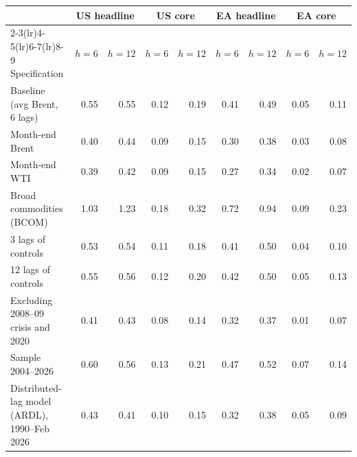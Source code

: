 \begin{tabular}{lrrrrrrrr}
\toprule
 & \multicolumn{2}{c}{US headline} & \multicolumn{2}{c}{US core} & \multicolumn{2}{c}{EA headline} & \multicolumn{2}{c}{EA core}\\
\cmidrule(lr){2-3}\cmidrule(lr){4-5}\cmidrule(lr){6-7}\cmidrule(lr){8-9}
Specification & $h=6$ & $h=12$ & $h=6$ & $h=12$ & $h=6$ & $h=12$ & $h=6$ & $h=12$\\
\midrule
Baseline (avg Brent, 6 lags) & 0.55 & 0.55 & 0.12 & 0.19 & 0.41 & 0.49 & 0.05 & 0.11\\
\midrule
Month-end Brent & 0.40 & 0.44 & 0.09 & 0.15 & 0.30 & 0.38 & 0.03 & 0.08\\
Month-end WTI & 0.39 & 0.42 & 0.09 & 0.15 & 0.27 & 0.34 & 0.02 & 0.07\\
Broad commodities (BCOM) & 1.03 & 1.23 & 0.18 & 0.32 & 0.72 & 0.94 & 0.09 & 0.23\\
3 lags of controls & 0.53 & 0.54 & 0.11 & 0.18 & 0.41 & 0.50 & 0.04 & 0.10\\
12 lags of controls & 0.55 & 0.56 & 0.12 & 0.20 & 0.42 & 0.50 & 0.05 & 0.13\\
Excluding 2008--09 crisis and 2020 & 0.41 & 0.43 & 0.08 & 0.14 & 0.32 & 0.37 & 0.01 & 0.07\\
Sample 2004--2026 & 0.60 & 0.56 & 0.13 & 0.21 & 0.47 & 0.52 & 0.07 & 0.14\\
Distributed-lag model (ARDL), 1990--Feb 2026 & 0.43 & 0.41 & 0.10 & 0.15 & 0.32 & 0.38 & 0.05 & 0.09\\
\bottomrule
\end{tabular}